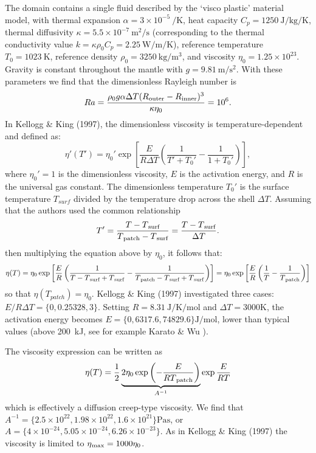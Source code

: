 The domain contains a single fluid described by the `visco plastic' material model, with thermal expansion $\alpha=3\times 10^{-5}~\si{\per\kelvin}$, heat capacity $C_p=1250~\si{\joule\per\kg\per\kelvin}$, thermal diffusivity $\kappa=5.5\times 10^{-7}~\si{\square\meter\per\second}$ (corresponding to the thermal conductivity value  $k=\kappa \rho_0 C_p=2.25~\si{\watt\per\meter\per\kelvin}$), reference temperature $T_0=1023~\si{\kelvin}$, reference density  $\rho_0=3250~\si{\kg\per\cubic\meter}$, and viscosity $\eta_0=1.25\times 10^{23}$. Gravity is constant throughout the mantle with $g=9.81~\si{\meter\per\square\second}$.
With these parameters we find that the dimensionless Rayleigh number is 
\begin{equation}
Ra 
=\frac{\rho_0 g \alpha \Delta T (R\textsubscript{outer}-R\textsubscript{inner})^3}{\kappa \eta_0}
=10^6.
\end{equation}
In Kellogg \& King (1997), the dimensionless viscosity is temperature-dependent and defined as:
\[
\eta'(T')
=\eta_0' \exp\left[ \frac{E}{R \Delta T} \left( \frac{1}{T'+T_0'} -\frac{1}{1+T_0'}  \right)   \right],
\]
where $\eta_0'=1$ is the dimensionless viscosity, $E$ is the activation energy, and $R$ is the universal gas constant. The dimensionless temperature $T_0'$ is the surface temperature $T_{surf}$ divided by the temperature drop across the shell $\Delta T$. 
Assuming that the authors used the common relationship	 
\[
T'=\frac{T-T\textsubscript{surf}}{T\textsubscript{patch}-T\textsubscript{surf}}= \frac{T-T\textsubscript{surf}}{\Delta T}.
\]
then multiplying the equation above by $\eta_0$, it follows that:
\[
\eta(T)
=\eta_0 \exp\left[ \frac{E}{R} \left( \frac{1}{T-T\textsubscript{surf}  + T\textsubscript{surf}} 
-\frac{1}{T\textsubscript{patch}-T\textsubscript{surf} + T\textsubscript{surf}}  \right)   \right]
=\eta_0 \exp\left[ \frac{E}{R} \left( \frac{1}{T} -\frac{1}{T\textsubscript{patch}}\right) \right]
\]
so that $\eta(T_{patch})=\eta_0$.
%
Kellogg \& King (1997) investigated three cases:
$E/R \Delta T = \{0,0.25328,3\}$. Setting $R=8.31~\si{\joule\per\kelvin\per\mol}$ and $\Delta T=3000\si{\kelvin}$, the activation energy becomes $E=\{ 0, 6317.6 , 74829.6 \}\si{\joule\per\mole}$, lower than typical values (above 200~\si{kJ}, see for example Karato \& Wu \cite{KW93}).

The viscosity expression can be written as
\[
\eta(T)  
= \frac12 \underbrace{2 \eta_0  \exp\left( -\frac{E}{R T\textsubscript{patch}} \right) }_{A^{-1}} \exp \frac{E}{R T}  
\]
which is effectively a diffusion creep-type viscosity.
We find that $A^{-1} = \{ 2.5\times 10^{22}, 1.98\times 10^{22} , 1.6\times 10^{21} \}\si{\pascal\second}$, or  $A = \{ 4\times 10^{-24}, 5.05\times 10^{-24},  6.26\times 10^{-23}\} $. As in Kellogg \& King (1997) the viscosity is limited to  $\eta\textsubscript{max}=1000\eta_0$. 

